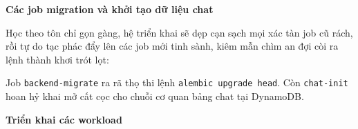 \vspace{0.5em}\noindent\textbf{Các job migration và khởi tạo dữ liệu
chat}\par

Học theo tôn chỉ gọn gàng, hệ triển khai sẽ dẹp cạn sạch mọi xác tàn job
cũ rách, rồi tự do tạc phác đẩy lên các job mới tinh sành, kiêm mẫn chìm
an đợi còi ra lệnh thành khơi trót lọt:

\begin{Shaded}
\begin{Highlighting}[]
 \OperatorTok{\textless{}}\OperatorTok{\textgreater{}}
 \OperatorTok{\textless{}}\OperatorTok{\textgreater{}}
\OperatorTok{=}\OperatorTok{=}
\OperatorTok{=}\OperatorTok{=}
\end{Highlighting}
\end{Shaded}

Job \texttt{backend-\allowbreak{}migrate} ra rã thọ thi lệnh
\texttt{alembic\ upgrade\ head}. Còn \texttt{chat-\allowbreak{}init} hoan hỷ khai mở
cất cọc cho chuỗi cơ quan bảng chat tại DynamoDB.

\vspace{0.5em}\noindent\textbf{Triển khai các
workload}\par

